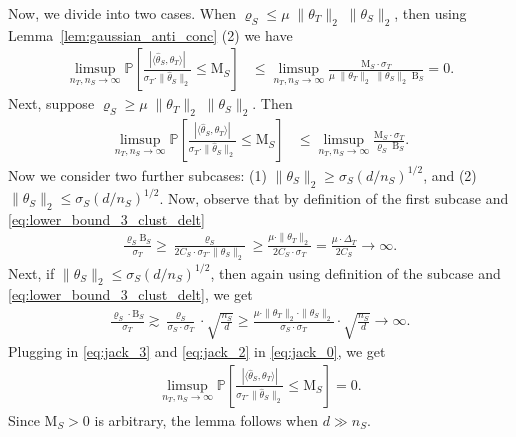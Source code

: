 \documentclass[10pt]{article}
\newcommand{\wh}{\widehat}
\newcommand{\trg}{T}
\newcommand{\thetaT}{\theta_{\trg}}
\newcommand{\nT}{n_{\trg}}
\newcommand{\sigmaT}{\sigma_{\trg}}
\newcommand{\DeltaT}{\Delta_{\trg}}
\newcommand{\src}{S}
\newcommand{\thetaS}{\theta_{\src}}
\newcommand{\nS}{n_{\src}}
\newcommand{\sigmaS}{\sigma_{\src}}
\begin{document}
Now, we divide into two cases. When $\varrho_\src \le \mu\; \|\thetaT\|_2\;\|\thetaS\|_2$, then using Lemma~\ref{lem:gaussian_anti_conc} (2) we have
\begin{align}
  \limsup_{\nT,\nS \to \infty}\mathbb P\left[\frac{|\langle \wh \theta_\src, \thetaT\rangle|}{\sigmaT \cdot \|\wh \theta_\src\|_2} \le \mathrm{M}_{\src}\right] & \le  \limsup_{\nT,\nS \to \infty} \frac{\mathrm M_\src \cdot \sigmaT}{\mu\;\|\thetaT\|_2\;\|\thetaS\|_2\;\mathrm B_\src}=0. 
\end{align}
Next, suppose $\varrho_\src \ge \mu\; \|\thetaT\|_2\;\|\thetaS\|_2$. Then 
\begin{align}
\label{eq:jack_0}
  \limsup_{\nT,\nS \to \infty}\mathbb P\left[\frac{|\langle \wh \theta_\src, \thetaT\rangle|}{\sigmaT \cdot \|\wh \theta_\src\|_2} \le \mathrm{M}_{\src}\right] & \le  \limsup_{\nT,\nS \to \infty} \frac{\mathrm M_\src \cdot \sigmaT}{\varrho_\src\;\mathrm B_\src}. 
\end{align}
Now we consider two further subcases: (1) $\|\thetaS\|_2 \ge \sigmaS(d/\nS)^{1/2}$, and (2) $\|\thetaS\|_2 \le \sigmaS(d/\nS)^{1/2}$. 
Now, observe that by definition of the first subcase and \eqref{eq:lower_bound_3_clust_delt}
\begin{align}
    \label{eq:jack_3}
    \frac{\varrho_\src\mathrm B_\src}{\sigmaT} \ge \frac{\varrho_\src}{2C_\src\cdot \sigmaT \cdot \|\thetaS\|_2} \ge \frac{\mu \cdot \|\thetaT\|_2}{2C_\src\cdot\sigmaT} = \frac{\mu \cdot \DeltaT}{2C_\src} \to \infty.
\end{align}
Next, if $\|\thetaS\|_2 \le \sigmaS(d/\nS)^{1/2}$, then again using definition of the subcase and \eqref{eq:lower_bound_3_clust_delt}, we get
\begin{align}
\label{eq:jack_2}
    \frac{\varrho_\src\cdot \mathrm B_\src}{\sigmaT} \gtrsim \frac{\varrho_\src}{\sigmaS \cdot \sigmaT}\cdot \sqrt{\frac{\nS}{d}} \ge \frac{\mu \cdot \|\thetaT\|_2 \cdot \|\thetaS\|_2}{\sigmaS \cdot \sigmaT}\cdot \sqrt{\frac{\nS}{d}} \to \infty.
\end{align}
Plugging in \eqref{eq:jack_3} and \eqref{eq:jack_2} in \eqref{eq:jack_0}, we get 
\begin{align}
\label{eq:jack_0_1}
  \limsup_{\nT,\nS \to \infty}\mathbb P\left[\frac{|\langle \wh \theta_\src, \thetaT\rangle|}{\sigmaT \cdot \|\wh \theta_\src\|_2} \le \mathrm{M}_{\src}\right] =0. 
\end{align}
Since $\mathrm M_\src>0$ is arbitrary, the lemma follows when $d \gg \nS$.
\end{document}
